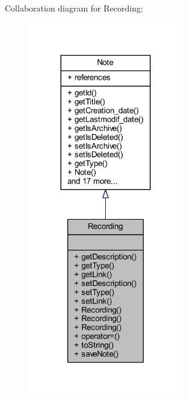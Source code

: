 Collaboration diagram for Recording\+:
\nopagebreak
\begin{figure}[H]
\begin{center}
\leavevmode
\includegraphics[width=191pt]{class_recording__coll__graph}
\end{center}
\end{figure}
